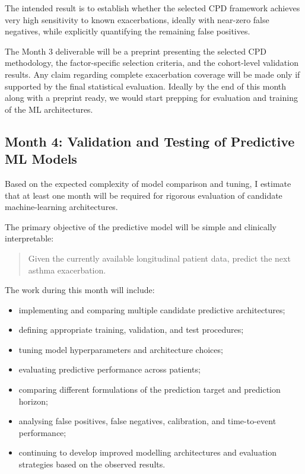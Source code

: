 \documentclass[11pt,a4paper]{article}
\begin{document}
The intended result is to establish whether the selected CPD framework achieves very high sensitivity to known exacerbations, ideally with near-zero false negatives, while explicitly quantifying the remaining false positives.

The Month 3 deliverable will be a preprint presenting the selected CPD methodology, the factor-specific selection criteria, and the cohort-level validation results. Any claim regarding complete exacerbation coverage will be made only if supported by the final statistical evaluation.
\newline
Ideally by the end of this month along with a preprint ready, we would start prepping for evaluation and training of the ML architectures.

\subsection{Month 4: Validation and Testing of Predictive ML Models}

Based on the expected complexity of model comparison and tuning, I estimate that at least one month will be required for rigorous evaluation of candidate machine-learning architectures.

The primary objective of the predictive model will be simple and clinically interpretable:

\begin{quote}
Given the currently available longitudinal patient data, predict the next asthma exacerbation.
\end{quote}

The work during this month will include:

\begin{itemize}[leftmargin=1.5em]
    \item implementing and comparing multiple candidate predictive architectures;
    \item defining appropriate training, validation, and test procedures;
    \item tuning model hyperparameters and architecture choices;
    \item evaluating predictive performance across patients;
    \item comparing different formulations of the prediction target and prediction horizon;
    \item analysing false positives, false negatives, calibration, and time-to-event performance;
    \item continuing to develop improved modelling architectures and evaluation strategies based on the observed results.
\end{itemize}
\end{document}
